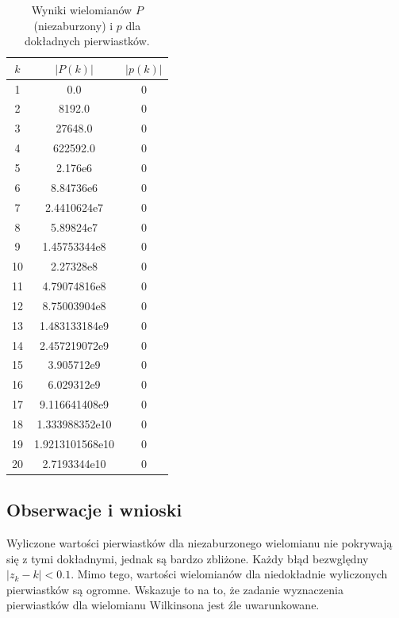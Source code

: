 \documentclass{article}
\begin{document}
\begin{table}[H]
\begin{adjustbox}{center}
\begin{tabular}{|c|c|c|}
    \hline
    $k$ & $|P(k)|$ & $|p(k)|$\\
    \hline
    1 & 0.0 & 0\\
    \hline
    2 & 8192.0 & 0\\
    \hline
    3 & 27648.0 & 0\\
    \hline
    4 & 622592.0 & 0\\
    \hline
    5 & 2.176e6 & 0\\
    \hline
    6 & 8.84736e6 & 0\\
    \hline
    7 & 2.4410624e7 & 0\\
    \hline
    8 & 5.89824e7 & 0\\
    \hline
    9 & 1.45753344e8 & 0\\
    \hline
    10 & 2.27328e8 & 0\\
    \hline
    11 & 4.79074816e8 & 0\\
    \hline
    12 & 8.75003904e8 & 0\\
    \hline
    13 & 1.483133184e9 & 0\\
    \hline
    14 & 2.457219072e9 & 0\\
    \hline
    15 & 3.905712e9 & 0\\
    \hline
    16 & 6.029312e9 & 0\\
    \hline
    17 & 9.116641408e9 & 0\\
    \hline
    18 & 1.333988352e10 & 0\\
    \hline
    19 & 1.9213101568e10 & 0\\
    \hline
    20 & 2.7193344e10 & 0\\
    \hline
\end{tabular}
\end{adjustbox}
\caption{Wyniki wielomianów $P$(niezaburzony) i $p$ dla dokładnych pierwiastków.}
\end{table}

\subsection{Obserwacje i wnioski}
Wyliczone wartości pierwiastków dla niezaburzonego wielomianu nie pokrywają się z tymi dokładnymi, jednak są bardzo
zbliżone. Każdy błąd bezwględny $|z_k - k| < 0.1$. Mimo tego, wartości wielomianów dla niedokładnie wyliczonych
pierwiastków są ogromne. Wskazuje to na to, że zadanie wyznaczenia pierwiastków dla wielomianu Wilkinsona jest źle
uwarunkowane.
\end{document}
